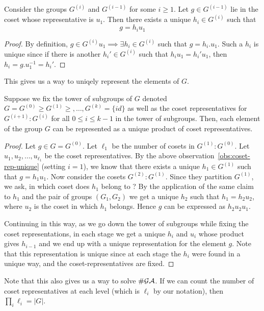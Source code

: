 \begin{observation}
	Consider the groups $G^{(i)}$ and $G^{(i-1)}$ for some $i \ge 1$. 
	Let $g \in G^{(i-1)}$ lie in the coset whose representative is $u_1$.
	Then there exists a unique $h_i \in G^{(i)}$ such that \[ g = h_iu_1\]
	\label{obs:coset-rep-unique}
\end{observation}
\begin{proof}
	By definition, $g \in G^{(i)}u_1 \implies \exists h_{i} \in G^{(i)}$
	such that $g = h_{i}.u_{1}$. Such a $h_{i}$ is unique since if there
	is another $h_i' \in G^{(i)}$ such that $h_{i}u_1 = h_i'u_1$, then $
	h_i = g.u_{1}^{-1} = h_{i}'$.
\end{proof}
This gives us a way to uniqely represent the elements of $G$.
\begin{theorem}
	Suppose we fix the tower of subgroups of $G$ denoted 
	$G = G^{(0)} \ge G^{(1)} \ge , \ldots, G^{(k)} = \{id\}$ as well as 
	the coset representatives for $G^{(i+1)}:G^{(i)}$ for all $0 \le i \le
	k-1$ in the tower of subgroups. Then, each element of the group $G$
	can be represented as a unique product of coset representatives.
	\label{th:tower-coset-repr}
\end{theorem}
\begin{proof}
	Let $g \in G = G^{(0)}$. Let $\ell_1$ be the number of cosets in
	$G^{(1)}:G^{(0)}$. Let $u_1, u_2, \ldots, u_{\ell_1}$ be the coset
	representatives. By the above
	observation~\ref{obs:coset-rep-unique} (setting $i=1$), we know that 
	there exists a unique $h_{1} \in G^{(1)}$ such that $g = h_1u_1$. Now
	consider the cosets $G^{(2)}:G^{(1)}$. Since they partition $G^{(1)}$, 
	we ask, in which coset does $h_{1}$ belong to ? By the application of 
	the same claim to $h_{1}$ and the pair of groups
	$(G_{1}, G_{2})$ we get a unique $h_{2}$ such that $h_{1} =
	h_{2}u_{2}$, where $u_2$ is the coset in which $h_{1}$ belongs. Hence
	$g$ can be expressed as $h_2u_2u_1$.  
	
	Continuing in this way, as we go
	down the tower of subgroups while fixing the coset representations, 
	in each stage we get a unique $h_i$ and $u_i$ whose product gives
	$h_{i-1}$ and we end up with a unique representation for the element
	$g$. Note that this representation is unique since at each stage the
	$h_{i}$ were found in a unique way, and the coset-representatives are
	fixed.
\end{proof}
Note that this also gives us a way to solve $\# \mathcal{GA}$. If we can count the
number of coset representatives at each level (which is $\ell_i$ by our
notation), then $\prod_i \ell_i = |G|$.

